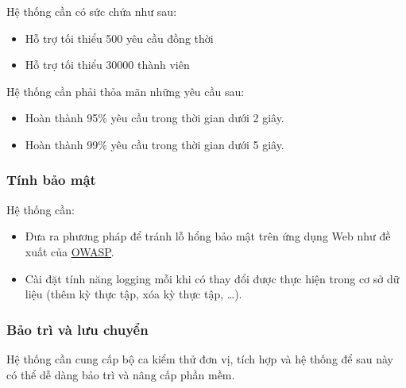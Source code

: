\documentclass[./../main.tex]{subfiles}
\begin{document}
Hệ thống cần có sức chứa như sau:

\begin{itemize}
	\item

	      Hỗ trợ tối thiểu 500 yêu cầu đồng thời

	\item

	      Hỗ trợ tối thiểu 30000 thành viên

\end{itemize}

Hệ thống cần phải thỏa mãn những yêu cầu sau:

\begin{itemize}
	\item

	      Hoàn thành 95\% yêu cầu trong thời gian dưới 2 giây.

	\item

	      Hoàn thành 99\% yêu cầu trong thời gian dưới 5 giây.

\end{itemize}

\hypertarget{tuxednh-bux1ea3o-mux1eadt}{%
	\subsubsection{Tính bảo mật}\label{tuxednh-bux1ea3o-mux1eadt}}

Hệ thống cần:

\begin{itemize}
	\item

	      Đưa ra phương pháp để tránh lỗ hổng bảo mật trên ứng dụng Web như đề
	      xuất của
	      \href{https://owasp.org/www-project-top-ten/}{\underline{OWASP}}.

	\item

	      Cài đặt tính năng logging mỗi khi có thay đổi được thực hiện trong cơ
	      sở dữ liệu (thêm kỳ thực tập, xóa kỳ thực tập, \ldots).

\end{itemize}

\hypertarget{bux1ea3o-truxec-vuxe0-lux1b0u-chuyux1ec3n}{%
	\subsubsection{Bảo trì và lưu
		chuyển}\label{bux1ea3o-truxec-vuxe0-lux1b0u-chuyux1ec3n}}

Hệ thống cần cung cấp bộ ca kiểm thử đơn vị, tích hợp và hệ thống để sau
này có thể dễ dàng bảo trì và nâng cấp phần mềm.
\end{document}
